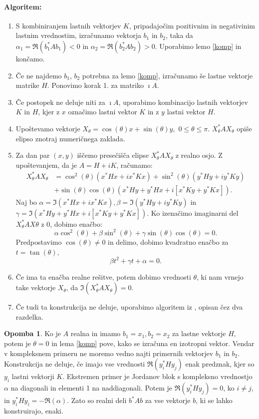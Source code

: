 \documentclass[12pt,a4paper]{amsart}
\theoremstyle{definition}
\newtheorem{opomba}[definicija]{Opomba}
\theoremstyle{plain}
\begin{document}
\paragraph{Algoritem:}
\begin{enumerate}[1.]
\item S kombiniranjem lastnih vektorjev $K$, pripadajočim pozitivnim in negativinim lastnim vrednostim, izračunamo vektorja $b_1$ in $b_2$, taka da  $\alpha_1=\Re(b_1^\ast Ab_1)<0$ in $\alpha_2=\Re(b_2^\ast Ab_2)>0$. Uporabimo lemo \ref{komp} in končamo.
\item Če ne najdemo $b_1$, $b_2$ potrebna za lemo \ref{komp}, izračunamo še lastne vektorje matrike $H$.  Ponovimo korak 1. za matriko $\imath A$.
\item Če postopek ne deluje niti za $\imath A$, uporabimo kombinacijo lastnih vektorjev $K$ in $H$, kjer z $x$ označimo lastni vektor $K$ in z $y$ lastni vektor $H$.
\item Upoštevamo vektorje $X_\theta =\cos(\theta)x+\sin(\theta)y,$ $0\le\theta\le\pi$. $X_\theta ^\ast AX_\theta$ opiše elipso znotraj numeričnega zaklada.
\item Za dan par $(x,y)$ iščemo presečišča elipse $X_\theta ^\ast AX_\theta$ z realno osjo. Z u\-po\-šte\-va\-njem, da je $A=H+iK$, računamo:
\begin{align*}
X_\theta^\ast AX_\theta &= \cos^2(\theta)(x^\ast Hx + ix^\ast Kx) + \sin^2(\theta)(y^\ast Hy + iy^\ast Ky)\\ 
&+\sin(\theta)\cos(\theta)(x^\ast Hy +y^\ast Hx +i[x^\ast Ky +y^\ast Kx]).
\end{align*}
Naj bo $\alpha=\Im(x^\ast Hx + ix^\ast Kx), \beta=\Im(y^\ast Hy +iy^\ast Ky)$ in $\gamma=\Im(x^\ast Hy +y^\ast Hx +i[x^\ast Ky +y^\ast Kx]).$ Ko izenačimo imaginarni del $X_\theta ^\ast AX\theta$ z 0, dobimo enačbo:
$$\alpha \cos^2(\theta) +\beta \sin^2(\theta) +\gamma \sin(\theta)\cos(\theta)=0.$$
Predpostavimo $\cos(\theta) \not =0$ in delimo, dobimo kvadratno enačbo za $t=\tan(\theta),$
$$\beta t^2 +\gamma t +\alpha =0.$$
\item Če ima ta enačba realne rešitve, potem dobimo vrednosti $\theta$, ki nam vrnejo take vektorje $X_\theta$, da $\Im(X_\theta ^\ast AX_\theta)=0$.
\item Če tudi ta konstrukcija ne deluje, uporabimo algoritem iz \cite{trije}, opisan čez dva razdelka.
\end{enumerate}

\begin{opomba}
Ko je $A$ realna in imamo $b_1=x_1, b_2=x_2$ za lastne vektorje $H$, potem je $\theta=0$ in lema \ref{komp} pove, kako se izračuna en izotropni vektor. Vendar v kompleksnem primeru ne moremo vedno najti primernih vektorjev $b_1$ in $b_2$. Konstrukcija ne deluje, če imajo vse vrednosti $\Re(y_i^\ast Hy_j)$ enak predznak, kjer so $y_i$ lastni vektorji $K.$ Ekstremen primer je Jordanov blok s kompleksno vrednostjo $\alpha$ na diagonali in elementi 1 na naddiagonali. Potem je $\Re(y_i^\ast Hy_j)=0$, ko $i\not=j$, in $y_i^\ast Hy_i=-\Re(\alpha)$. Zato so realni deli $b^\ast Ab$ za vse vektorje $b$, ki se lahko konstruirajo, enaki.
\end{opomba}
\end{document}
